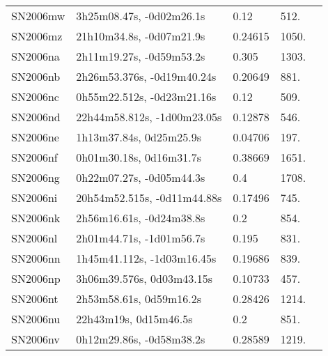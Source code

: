 \begin{longtable}{lllll}
         SN2006mw &       3h25m08.47s, -0d02m26.1s &     0.12 &           512. &    \citet{2006CBET..726A...1B} \\
         SN2006mz &       21h10m34.8s, -0d07m21.9s &  0.24615 &          1050. &    \citet{2016SDSSD.C...0000:} \\
         SN2006na &       2h11m19.27s, -0d59m53.2s &    0.305 &          1303. &    \citet{2011ApJ...740...92G} \\
         SN2006nb &     2h26m53.376s, -0d19m40.24s &  0.20649 &           881. &    \citet{2016SDSSD.C...0000:} \\
         SN2006nc &     0h55m22.512s, -0d23m21.16s &     0.12 &           509. &    \citet{2006CBET..735A...1B} \\
         SN2006nd &    22h44m58.812s, -1d00m23.05s &  0.12878 &           546. &    \citet{2004SDSS2.C...0000:} \\
         SN2006ne &        1h13m37.84s, 0d25m25.9s &  0.04706 &           197. &    \citet{2016SDSSD.C...0000:} \\
         SN2006nf &        0h01m30.18s, 0d16m31.7s &  0.38669 &          1651. &    \citet{2016SDSSD.C...0000:} \\
         SN2006ng &       0h22m07.27s, -0d05m44.3s &      0.4 &          1708. &    \citet{2006CBET..740A...1B} \\
         SN2006ni &    20h54m52.515s, -0d11m44.88s &  0.17496 &           745. &    \citet{2004SDSS2.C...0000:} \\
         SN2006nk &       2h56m16.61s, -0d24m38.8s &      0.2 &           854. &    \citet{2006CBET..740A...1B} \\
         SN2006nl &       2h01m44.71s, -1d01m56.7s &    0.195 &           831. &    \citet{2011ApJ...740...92G} \\
         SN2006nn &     1h45m41.112s, -1d03m16.45s &  0.19686 &           839. &    \citet{2011ApJ...740...92G} \\
         SN2006np &      3h06m39.576s, 0d03m43.15s &  0.10733 &           457. &    \citet{2001SDSSe.1...0000:} \\
         SN2006nt &        2h53m58.61s, 0d59m16.2s &  0.28426 &          1214. &    \citet{2016SDSSD.C...0000:} \\
         SN2006nu &          22h43m19s, 0d15m46.5s &      0.2 &           851. &    \citet{2006CBET..743A...1B} \\
         SN2006nv &       0h12m29.86s, -0d58m38.2s &  0.28589 &          1219. &    \citet{2016SDSSD.C...0000:} \\

\end{longtable}
